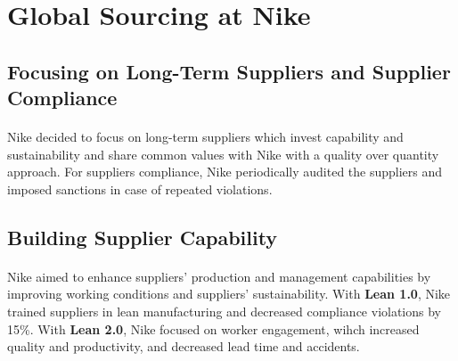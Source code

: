 \section{Global Sourcing at Nike}

\subsection{Focusing on Long-Term Suppliers and Supplier Compliance}

\paragraph{} Nike decided to focus on long-term suppliers which invest capability and sustainability and share common values with Nike with a quality over quantity approach. For suppliers compliance, Nike periodically audited the suppliers and imposed sanctions in case of repeated violations.

\subsection{Building Supplier Capability}

\paragraph{} Nike aimed to enhance suppliers' production and management capabilities by improving working conditions and suppliers' sustainability. With \textbf{Lean 1.0}, Nike trained suppliers in lean manufacturing and decreased compliance violations by 15\%. With \textbf{Lean 2.0}, Nike focused on worker engagement, wihch increased quality and productivity, and decreased lead time and accidents.